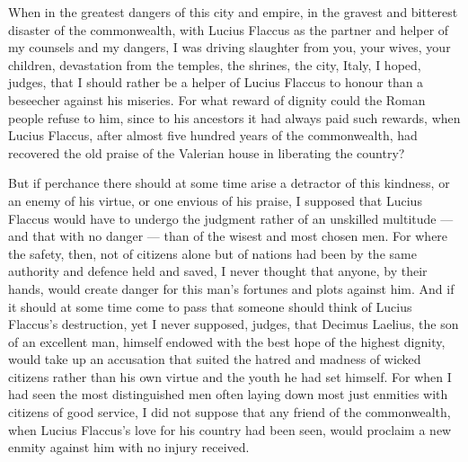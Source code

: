 %

 When in the greatest dangers of this city and empire, in the gravest and bitterest disaster of the commonwealth, with Lucius Flaccus as the partner and helper of my counsels and my dangers, I was driving slaughter from you, your wives, your children, devastation from the temples, the shrines, the city, Italy, I hoped, judges, that I should rather be a helper of Lucius Flaccus to honour than a beseecher against his miseries. For what reward of dignity could the Roman people refuse to him, since to his ancestors it had always paid such rewards, when Lucius Flaccus, after almost five hundred years of the commonwealth, had recovered the old praise of the Valerian house in liberating the country?

 But if perchance there should at some time arise a detractor of this kindness, or an enemy of his virtue, or one envious of his praise, I supposed that Lucius Flaccus would have to undergo the judgment rather of an unskilled multitude --- and that with no danger --- than of the wisest and most chosen men. For where the safety, then, not of citizens alone but of nations had been by the same authority and defence held and saved, I never thought that anyone, by their hands, would create danger for this man's fortunes and plots against him. And if it should at some time come to pass that someone should think of Lucius Flaccus's destruction, yet I never supposed, judges, that Decimus Laelius, the son of an excellent man, himself endowed with the best hope of the highest dignity, would take up an accusation that suited the hatred and madness of wicked citizens rather than his own virtue and the youth he had set himself. For when I had seen the most distinguished men often laying down most just enmities with citizens of good service, I did not suppose that any friend of the commonwealth, when Lucius Flaccus's love for his country had been seen, would proclaim a new enmity against him with no injury received.

